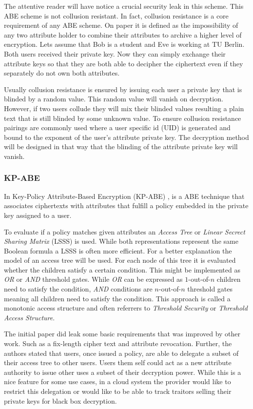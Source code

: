 The attentive reader will have notice a crucial security leak in this scheme. This \ac{ABE} scheme is not collusion resistant. In fact, collusion resistance is a core requirement of any ABE scheme. On paper it is defined as the impossibility of any two attribute holder to combine their attributes to archive a higher level of encryption. Lets assume that Bob is a student and Eve is working at \ac{TU} Berlin. Both users received their private key. Now they can simply exchange their attribute keys so that they are both able to decipher the ciphertext even if they separately do not own both attributes.  

Usually collusion resistance is ensured by issuing each user a private key that is blinded by a random value. This random value will vanish on decryption. However, if two users collude they will mix their blinded values resulting a plain text that is still blinded by some unknown value. To ensure collusion resistance pairings are commonly used where a user specific id (\ac{UID}) is generated and bound to the exponent of the user's attribute private key. The decryption method will be designed in that way that the blinding of the attribute private key will vanish. 

\subsubsection{\ac{KP-ABE}}
In Key-Policy Attribute-Based Encryption (\ac{KP-ABE}) \cite{goyal2006attribute}, is a \ac{ABE} technique that associates ciphertexts with attributes that fulfill a policy embedded in the private key assigned to a user. 

To evaluate if a policy matches given attributes an \textit{Access Tree} or \textit{Linear Secrect Sharing Matrix} (\ac{LSSS}) is used. While both representations represent the same Boolean formula a \ac{LSSS} is often more efficient. For a better explanation the model of an access tree will be used. For each node of this tree it is evaluated whether the children satisfy a certain condition. This might be implemented as \textit{OR} or \textit{AND} threshold gates. While \textit{OR} can be expressed as $1$-out-of-$n$ children need to satisfy the condition, \textit{AND} conditions are $n$-out-of-$n$ threshold gates meaning all children need to satisfy the condition. This approach is called a monotonic access structure and often referrers to \textit{Threshold Security} or \textit{Threshold Access Structure}. 

The initial paper \cite{goyal2006attribute} did leak some basic requirements that was improved by other work. Such as a fix-length cipher text and attribute revocation. Further, the authors stated that users, once issued a policy, are able to delegate a subset of their access tree to other users. Users them self could act as a new attribute authority to issue other uses a subset of their decryption power. While this is a nice feature for some use cases, in a cloud system the provider would like to restrict this delegation or would like to be able to track traitors selling their private keys for black box decryption.

